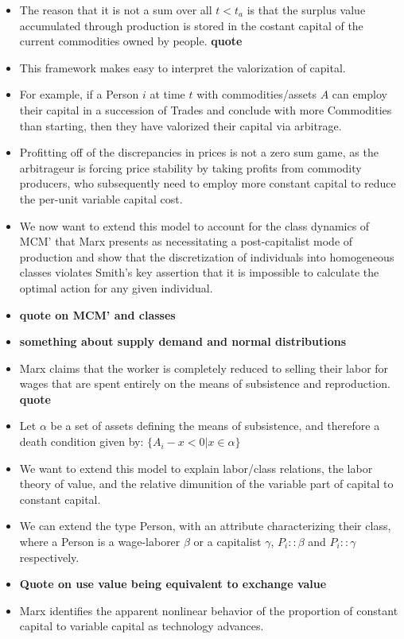 \documentclass[12pt]{article}
\begin{document}
\begin{itemize}
    \item The reason that it is not a sum over all $t < t_a$ is that the surplus value accumulated through production is stored in the costant capital of the current commodities owned by people. \textbf{quote}
    \item This framework makes easy to interpret the valorization of capital.
    \item For example, if a Person $i$ at time $t$ with commodities/assets $A$ can employ their capital in a succession of Trades and conclude with more Commodities than starting, then they have valorized their capital via arbitrage.
    \item  Profitting off of the discrepancies in prices is not a zero sum game, as the arbitrageur is forcing price stability by taking profits from commodity producers, who subsequently need to employ more constant capital to reduce the per-unit variable capital cost.
    \item We now want to extend this model to account for the class dynamics of MCM' that Marx presents as necessitating a post-capitalist mode of production and show that the discretization of individuals into homogeneous classes violates Smith's key assertion that it is impossible to calculate the optimal action for any given individual. 
    \item \textbf{quote on MCM' and classes}
    \item \textbf{something about supply demand and normal distributions}
    \item Marx claims that the worker is completely reduced to selling their labor for wages that are spent entirely on the means of subsistence and reproduction. \textbf{quote}
    \item Let $\alpha$ be a set of assets defining the means of subsistence, and therefore a death condition given by: $\{A_i - x < 0| x \in \alpha \}$  
    \item We want to extend this model to explain labor/class relations, the labor theory of value, and the relative dimunition of the variable part of capital to constant capital.
    \item We can extend the type Person, with an attribute characterizing their class, where a Person is a wage-laborer $\beta$ or a capitalist $\gamma$, $P_i::\beta$ and $P_i::\gamma$ respectively.
    \item \textbf{Quote on use value being equivalent to exchange value}
    \item Marx identifies the apparent nonlinear behavior of the proportion of constant capital to variable capital as technology advances.

\end{itemize}
\end{document}

